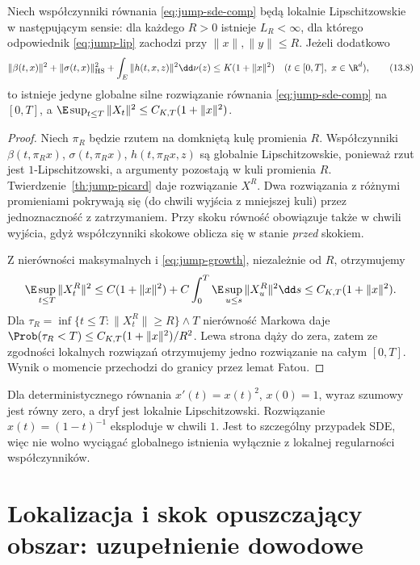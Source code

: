 \begin{twierdzenie}
\label{th:jump-local-explosion}
Niech współczynniki równania \eqref{eq:jump-sde-comp}
będą lokalnie Lipschitzowskie w następującym sensie:
dla każdego $R>0$ istnieje $L_R<\infty$, dla którego
odpowiednik \eqref{eq:jump-lip} zachodzi przy
$\|x\|,\|y\|\le R$. Jeżeli dodatkowo
\[
 \|\beta(t,x)\|^2+\|\sigma(t,x)\|_{\mathrm{HS}}^2
 +\int_E\|h(t,x,z)\|^2\dd\nu(z)
 \le K(1+\|x\|^2)
 \quad(t\in[0,T],\ x\in\R^d),
 \tag{13.8}\label{eq:jump-growth}
\]
to istnieje jedyne globalne silne rozwiązanie równania
\eqref{eq:jump-sde-comp} na $[0,T]$, a
$\E\sup_{t\le T}\|X_t\|^2\le C_{K,T}(1+\|x\|^2)$.
\end{twierdzenie}
\begin{proof}
Niech $\pi_R$ będzie rzutem na domkniętą kulę promienia
$R$. Współczynniki $\beta(t,\pi_Rx)$,
$\sigma(t,\pi_Rx)$, $h(t,\pi_Rx,z)$ są globalnie
Lipschitzowskie, ponieważ rzut jest $1$-Lipschitzowski,
a argumenty pozostają w kuli promienia $R$.
Twierdzenie~\ref{th:jump-picard} daje rozwiązanie $X^R$.
Dwa rozwiązania z różnymi promieniami pokrywają się
(do chwili wyjścia z mniejszej kuli) przez jednoznaczność
z zatrzymaniem. Przy skoku równość obowiązuje także
w chwili wyjścia, gdyż współczynniki skokowe oblicza się
w stanie \emph{przed} skokiem.

Z nierówności maksymalnych i \eqref{eq:jump-growth},
niezależnie od $R$, otrzymujemy
\[
 \E\sup_{t\le T}\|X^R_t\|^2
 \le C(1+\|x\|^2)+C\int_0^T
 \E\sup_{u\le s}\|X^R_u\|^2\dd s
 \le C_{K,T}(1+\|x\|^2).
\]
Dla $\tau_R=\inf\{t\le T:\|X^R_t\|\ge R\}\wedge T$
nierówność Markowa daje
$\Prob(\tau_R<T)\le C_{K,T}(1+\|x\|^2)/R^2$.
Lewa strona dąży do zera, zatem ze zgodności lokalnych
rozwiązań otrzymujemy jedno rozwiązanie na całym $[0,T]$.
Wynik o momencie przechodzi do granicy przez lemat Fatou.
\end{proof}

\begin{uwaga}
Dla deterministycznego równania $x'(t)=x(t)^2$, $x(0)=1$,
wyraz szumowy jest równy zero, a dryf jest lokalnie
Lipschitzowski. Rozwiązanie $x(t)=(1-t)^{-1}$ eksploduje
w chwili $1$. Jest to szczególny przypadek SDE, więc
nie wolno wyciągać globalnego istnienia wyłącznie z
lokalnej regularności współczynników.
\end{uwaga}


\section{Lokalizacja i skok opuszczający obszar: uzupełnienie dowodowe}

